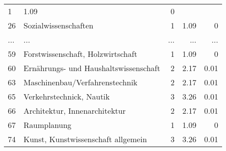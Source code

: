 \begin{longtable}{lXrrr}
          \num{1} &
          \num[round-mode=places,round-precision=2]{1,09} &
          \num[round-mode=places,round-precision=2]{0} \\
        26 & \multicolumn{1}{X}{Sozialwissenschaften} & %
          \num{1} &
          \num[round-mode=places,round-precision=2]{1,09} &
          \num[round-mode=places,round-precision=2]{0} \\
       ... & ... & ... & ... & ... \\
        59 & \multicolumn{1}{X}{Forstwissenschaft, Holzwirtschaft} & %
          \num{1} &
          \num[round-mode=places,round-precision=2]{1,09} &
          \num[round-mode=places,round-precision=2]{0} \\

        60 & \multicolumn{1}{X}{Ernährungs- und Haushaltswissenschaft} & %
          \num{2} &
          \num[round-mode=places,round-precision=2]{2,17} &
          \num[round-mode=places,round-precision=2]{0,01} \\

        63 & \multicolumn{1}{X}{Maschinenbau/Verfahrenstechnik} & %
          \num{2} &
          \num[round-mode=places,round-precision=2]{2,17} &
          \num[round-mode=places,round-precision=2]{0,01} \\

        65 & \multicolumn{1}{X}{Verkehrstechnick, Nautik} & %
          \num{3} &
          \num[round-mode=places,round-precision=2]{3,26} &
          \num[round-mode=places,round-precision=2]{0,01} \\

        66 & \multicolumn{1}{X}{Architektur, Innenarchitektur} & %
          \num{2} &
          \num[round-mode=places,round-precision=2]{2,17} &
          \num[round-mode=places,round-precision=2]{0,01} \\

        67 & \multicolumn{1}{X}{Raumplanung} & %
          \num{1} &
          \num[round-mode=places,round-precision=2]{1,09} &
          \num[round-mode=places,round-precision=2]{0} \\

        74 & \multicolumn{1}{X}{Kunst, Kunstwissenschaft allgemein} & %
          \num{3} &
          \num[round-mode=places,round-precision=2]{3,26} &
          \num[round-mode=places,round-precision=2]{0,01} \\


\end{longtable}
